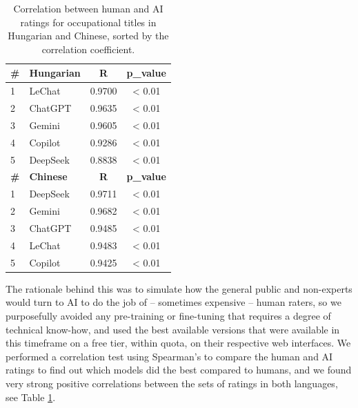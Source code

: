 \documentclass[runningheads]{llncs}
\begin{document}
\begin{table}
  \centering
  \vspace{-14pt}
  \caption{Correlation between human and AI ratings for occupational titles in Hungarian and Chinese, sorted by the correlation coefficient.}
  \label{tab:correlation}
  \begin{tabularx}{0.48\textwidth}{@{}l X c c@{}}
    \toprule
    \textbf{\#} & \textbf{Hungarian} & \textbf{R} & \textbf{p\_value} \\
    \midrule
    1 & LeChat   & 0.9700 & < 0.01 \\
    2 & ChatGPT  & 0.9635 & < 0.01 \\
    3 & Gemini   & 0.9605 & < 0.01 \\
    4 & Copilot  & 0.9286 & < 0.01 \\
    5 & DeepSeek & 0.8838 & < 0.01 \\
    \addlinespace
    \textbf{\#} & \textbf{Chinese} & \textbf{R} & \textbf{p\_value} \\
    \midrule
    1 & DeepSeek & 0.9711 & < 0.01 \\
    2 & Gemini   & 0.9682 & < 0.01 \\
    3 & ChatGPT  & 0.9485 & < 0.01 \\
    4 & LeChat   & 0.9483 & < 0.01 \\
    5 & Copilot  & 0.9425 & < 0.01 \\
    \bottomrule
  \end{tabularx}
  \vspace{-10pt}
\end{table}

The rationale behind this was to simulate how the general public and non-experts would turn to AI to do the job of -- sometimes expensive -- human raters, so we purposefully avoided any pre-training or fine-tuning that requires a degree of technical know-how, and used the best available versions that were available in this timeframe on a free tier, within quota, on their respective web interfaces. We performed a correlation test using Spearman's \textit{\rho} to compare the human and AI ratings to find out which models did the best compared to humans, and we found very strong positive correlations between the sets of ratings in both languages, see Table \ref{tab:correlation}.


\end{document}
